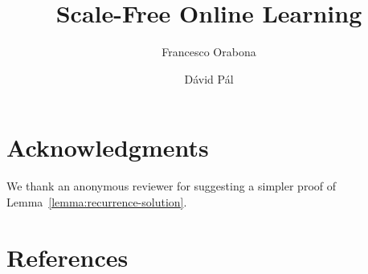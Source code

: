 \documentclass{elsarticle}
\begin{document}
\begin{frontmatter}

\title{Scale-Free Online Learning}


\author{Francesco Orabona}
\address{Stony Brook University, Stony Brook, NY 11794, USA}

\author{D\'avid P\'al}

\address{Yahoo Research, 14th Floor, 229 West 43rd Street, New York, NY 10036, USA}

\begin{abstract}

\end{abstract}

\end{frontmatter}









\section*{Acknowledgments}
We thank an anonymous reviewer for suggesting a simpler proof of
Lemma~\ref{lemma:recurrence-solution}.

\section*{References}




\appendix






\end{document}
